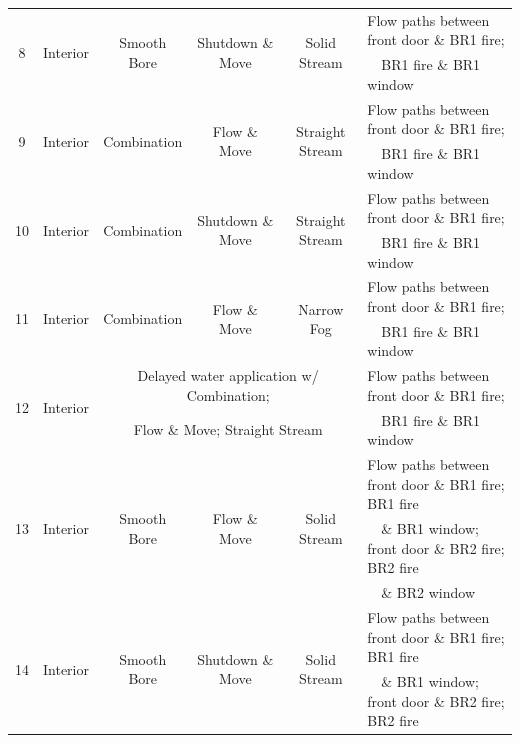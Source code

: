\documentclass[12pt,oneside]{book}
\begin{document}
\begin{table}[H]
{\begin{tabular}{|c|c|c|c|c|l|}
\hline
\multirow{2}{*}{8}	& \multirow{2}{*}{Interior} & \multirow{2}{*}{Smooth Bore} 	& \multirow{2}{*}{Shutdown \& Move}	& \multirow{2}{*}{Solid Stream} 	& Flow paths between front door \& BR1 fire; 	\\
 					& 							& 								& 									& 									& ~~BR1 fire \& BR1 window 	\\
\hline
\multirow{2}{*}{9}	& \multirow{2}{*}{Interior} & \multirow{2}{*}{Combination} 	& \multirow{2}{*}{Flow \& Move}		& \multirow{2}{*}{Straight Stream} 	& Flow paths between front door \& BR1 fire; \\
					& 							& 								& 									& 									& ~~BR1 fire \& BR1 window 	\\
\hline
\multirow{2}{*}{10}	& \multirow{2}{*}{Interior} & \multirow{2}{*}{Combination} 	& \multirow{2}{*}{Shutdown \& Move}	& \multirow{2}{*}{Straight Stream} 	& Flow paths between front door \& BR1 fire; 	\\
 					& 							& 								& 									& 									& ~~BR1 fire \& BR1 window 	\\
\hline
\multirow{2}{*}{11}	& \multirow{2}{*}{Interior} & \multirow{2}{*}{Combination} 	& \multirow{2}{*}{Flow \& Move} 	&  \multirow{2}{*}{Narrow Fog} 		& Flow paths between front door \& BR1 fire; 	\\
 					& 							& 								& 									&  									& ~~BR1 fire \& BR1 window 	\\
\hline
\multirow{2}{*}{12}	& \multirow{2}{*}{Interior} & \multicolumn{3}{c|}{Delayed water application w/ Combination;} 										& Flow paths between front door \& BR1 fire; 	\\
					& 							& \multicolumn{3}{c|}{Flow \& Move; Straight Stream} 													& ~~BR1 fire \& BR1 window 	\\
\hline \hline
\multirow{3}{*}{13}	& \multirow{3}{*}{Interior} & \multirow{3}{*}{Smooth Bore} 	& \multirow{3}{*}{Flow \& Move}		& \multirow{3}{*}{Solid Stream} 	& Flow paths between front door \& BR1 fire; BR1 fire \\
					& 							& 								& 									& 									& ~~\& BR1 window; front door \& BR2 fire; BR2 fire	\\
					& 							& 								& 									& 									& ~~\& BR2 window \\
\hline
\multirow{3}{*}{14}	& \multirow{3}{*}{Interior} & \multirow{3}{*}{Smooth Bore} 	& \multirow{3}{*}{Shutdown \& Move}	& \multirow{3}{*}{Solid Stream} 	& Flow paths between front door \& BR1 fire; BR1 fire \\
					& 							& 								& 									& 									& ~~\& BR1 window; front door \& BR2 fire; BR2 fire	\\

\end{tabular}}
\end{table}
\end{document}
